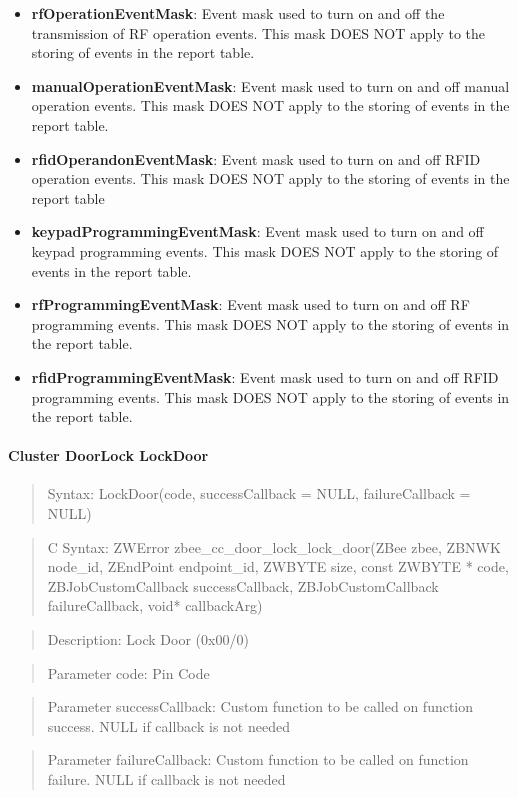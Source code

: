 \begin{itemize}
\item \textbf{rfOperationEventMask}: Event mask used to turn on and off the transmission of RF operation events. This mask DOES NOT apply to the storing of events in the report table.
\item \textbf{manualOperationEventMask}: Event mask used to turn on and off manual operation events. This mask DOES NOT apply to the storing of events in the report table.
\item \textbf{rfidOperandonEventMask}: Event mask used to turn on and off RFID operation events. This mask DOES NOT apply to the storing of events in the report table
\item \textbf{keypadProgrammingEventMask}: Event mask used to turn on and off keypad programming events. This mask DOES NOT apply to the storing of events in the report table.
\item \textbf{rfProgrammingEventMask}: Event mask used to turn on and off RF programming events. This mask DOES NOT apply to the storing of events in the report table.
\item \textbf{rfidProgrammingEventMask}: Event mask used to turn on and off RFID programming events. This mask DOES NOT apply to the storing of events in the report table.
\end{itemize}

\paragraph{Cluster DoorLock LockDoor}
\begin{quote}Syntax: LockDoor(code, successCallback = NULL, failureCallback = NULL)\end{quote}
\begin{quote}C Syntax: ZWError zbee\_cc\_door\_lock\_lock\_door(ZBee zbee, ZBNWK node\_id, ZEndPoint endpoint\_id, ZWBYTE size, const ZWBYTE * code, ZBJobCustomCallback successCallback, ZBJobCustomCallback failureCallback, void* callbackArg)\end{quote}
\begin{quote}Description: Lock Door (0x00/0)\end{quote}
\begin{quote}Parameter code: Pin Code\end{quote}
\begin{quote}Parameter successCallback: Custom function to be called on function success. NULL if callback is not needed\end{quote}
\begin{quote}Parameter failureCallback: Custom function to be called on function failure. NULL if callback is not needed\end{quote}


